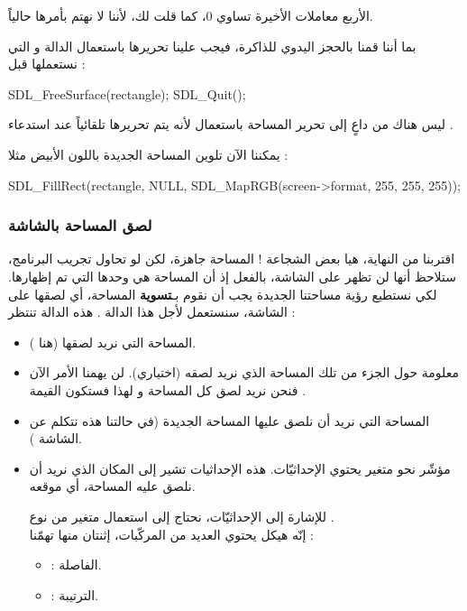 الأربع معاملات الأخيرة تساوي 0، كما قلت لك، لأننا لا نهتم بأمرها حالياً. 

بما أننا قمنا بالحجز اليدوي للذاكرة، فيجب علينا تحريرها باستعمال الدالة 
و التي نستعملها قبل 
 :

\begin{Csource}
SDL_FreeSurface(rectangle);
SDL_Quit();
\end{Csource}

\begin{information}
ليس هناك من داعٍ إلى تحرير المساحة
باستعمال
لأنه يتم تحريرها تلقائياً عند استدعاء
.
\end{information}

يمكننا الآن تلوين المساحة الجديدة باللون الأبيض مثلا :

\begin{Csource}
SDL_FillRect(rectangle, NULL, SDL_MapRGB(screen->format, 255, 255, 255));
\end{Csource}

\subsubsection{لصق المساحة بالشاشة}

اقتربنا من النهاية، هيا بعض الشجاعة ! المساحة جاهزة، لكن لو تحاول تجريب البرنامج، ستلاحظ أنها لن تظهر على الشاشة، بالفعل إذ أن المساحة
هي وحدها التي تم إظهارها. لكي نستطيع رؤية مساحتنا الجديدة يجب أن نقوم بـ\textbf{تسوية}
المساحة، أي لصقها على الشاشة، سنستعمل لأجل هذا الدالة 
.
 هذه الدالة تنتظر :
 
\begin{itemize}
	\item المساحة التي نريد لصقها (هنا 
	).
	\item معلومة حول الجزء من تلك المساحة الذي نريد لصقه (اختياري). لن يهمنا الأمر الآن فنحن نريد لصق كل المساحة و لهذا فستكون القيمة
	.
	\item المساحة التي نريد أن نلصق عليها المساحة الجديدة (في حالتنا هذه نتكلم عن الشاشة 
	).
	\item مؤشّر نحو متغير يحتوي الإحداثيّات. هذه الإحداثيات تشير إلى المكان الذي نريد أن نلصق عليه المساحة، أي موقعه.
	
للإشارة إلى الإحداثيّات، نحتاج إلى استعمال متغير من نوع 
.\\
إنّه هيكل يحتوي العديد من المركّبات، إثنتان منها تهمّنا :
	\begin{itemize}
		\item {} : 
الفاصلة.
		\item {} : 
الترتيبة. 
	\end{itemize}	
\end{itemize}

